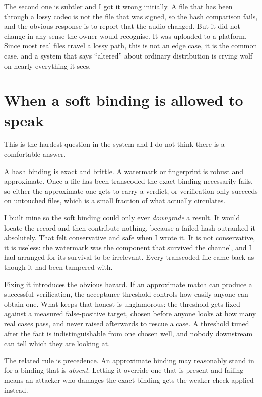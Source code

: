 \documentclass[11pt]{article}
\begin{document}
The second one is subtler and I got it wrong initially. A file that has been
through a lossy codec is not the file that was signed, so the hash comparison
fails, and the obvious response is to report that the audio changed. But it did
not change in any sense the owner would recognise. It was uploaded to a platform.
Since most real files travel a lossy path, this is not an edge case, it is the
common case, and a system that says ``altered'' about ordinary distribution is
crying wolf on nearly everything it sees.

\section{When a soft binding is allowed to speak}

This is the hardest question in the system and I do not think there is a
comfortable answer.

A hash binding is exact and brittle. A watermark or fingerprint is robust and
approximate. Once a file has been transcoded the exact binding necessarily fails,
so either the approximate one gets to carry a verdict, or verification only
succeeds on untouched files, which is a small fraction of what actually
circulates.

I built mine so the soft binding could only ever \emph{downgrade} a result. It
would locate the record and then contribute nothing, because a failed hash
outranked it absolutely. That felt conservative and safe when I wrote it. It is
not conservative, it is useless: the watermark was the component that survived
the channel, and I had arranged for its survival to be irrelevant. Every
transcoded file came back as though it had been tampered with.

Fixing it introduces the obvious hazard. If an approximate match can produce a
successful verification, the acceptance threshold controls how easily anyone can
obtain one. What keeps that honest is unglamorous: the threshold gets fixed
against a measured false-positive target, chosen before anyone looks at how many
real cases pass, and never raised afterwards to rescue a case. A threshold tuned
after the fact is indistinguishable from one chosen well, and nobody downstream
can tell which they are looking at.

The related rule is precedence. An approximate binding may reasonably stand in
for a binding that is \emph{absent}. Letting it override one that is present and
failing means an attacker who damages the exact binding gets the weaker check
applied instead.
\end{document}
